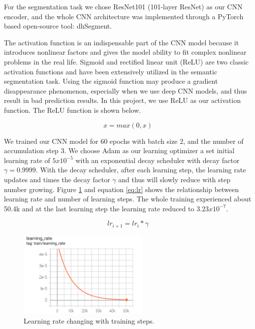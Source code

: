 \documentclass[12pt]{article}
\begin{document}
For the segmentation task we chose ResNet101 (101-layer ResNet) as our CNN encoder, and the whole CNN architecture was implemented through a PyTorch\cite{NEURIPS2019_9015} based open-source tool: dhSegment\cite{oliveiraseguinkaplan2018dhsegment}.

The activation function is an indispensable part of the CNN model because it introduces nonlinear factors and gives the model ability to fit complex nonlinear problems in the real life. Sigmoid and rectified linear unit (ReLU) are two classic activation functions and have been extensively utilized in the semantic segmentation task. Using the sigmoid function may produce a gradient disappearance phenomenon, especially when we use deep CNN models, and thus result in bad prediction results. In this project, we use ReLU as our activation function. The ReLU function is shown below.

\begin{equation}
    x = max(0, x)
\end{equation}


We trained our CNN model for 60 epochs with batch size 2, and the number of accumulation step 3.  We choose Adam as our learning optimizer a set initial learning rate of $5x10^{-5}$ with an exponential decay scheduler with decay factor $\gamma=0.9999$. With the decay scheduler, after each learning step, the learning rate updates and times the decay factor $\gamma$ and thus will slowly reduce with step number growing. Figure \ref{fig:learning_rate} and equation \ref{eq:lr} shows the relationship between learning rate and number of learning steps. The whole training experienced about 50.4k and at the last learning step the learning rate reduced to $3.23x10^{-7}$.



\begin{equation}
    lr_{i+1}=lr_{i} * \gamma
    \label{eq:lr}
\end{equation}

\begin{figure}[H]
    \centering
    \includegraphics[height=120pt]{images/lr.png}
    \caption{Learning rate changing with training steps.}
    \label{fig:learning_rate}
\end{figure}
\end{document}
